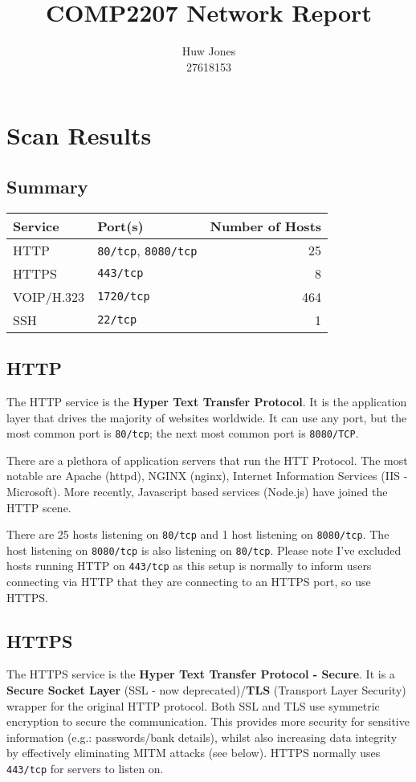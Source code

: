 \documentclass[a4paper]{article}
\author{Huw Jones \\27618153}
\title{COMP2207 Network Report}
\begin{document}
\maketitle
\newpage

\section{Scan Results}
\subsection{Summary}
\begin{tabular}{|l|l|r|}\hline
Service & Port(s) & Number of Hosts \\ \hline
HTTP & \texttt{80/tcp}, \texttt{8080/tcp} & 25 \\ \hline
HTTPS & \texttt{443/tcp} & 8 \\ \hline
VOIP/H.323 & \texttt{1720/tcp} & 464 \\ \hline
SSH & \texttt{22/tcp} & 1 \\ \hline
\end{tabular}

\subsection{HTTP}
The HTTP service is the \textbf{Hyper Text Transfer Protocol}.
It is the application layer that drives the majority of websites worldwide.
It can use any port, but the most common port is \texttt{80/tcp}; the next most common port is \texttt{8080/TCP}.

There are a plethora of application servers that run the HTT Protocol.
The most notable are Apache (httpd), NGINX (nginx), Internet Information Services (IIS - Microsoft).
More recently, Javascript based services (Node.js) have joined the HTTP scene.

There are 25 hosts listening on \texttt{80/tcp} and 1 host listening on \texttt{8080/tcp}.
The host listening on \texttt{8080/tcp} is also listening on \texttt{80/tcp}.
Please note I've excluded hosts running HTTP on \texttt{443/tcp} as this setup is normally to inform users connecting via HTTP that they are connecting to an HTTPS port, so use HTTPS.

\subsection{HTTPS}
The HTTPS service is the \textbf{Hyper Text Transfer Protocol - Secure}.
It is a \textbf{Secure Socket Layer} (SSL - now deprecated)/\textbf{TLS} (Transport Layer Security) wrapper for the original HTTP protocol.
Both SSL and TLS use symmetric encryption to secure the communication.
This provides more security for sensitive information (e.g.: passwords/bank details), whilst also increasing data integrity by effectively eliminating MITM attacks (see below).
HTTPS normally uses \texttt{443/tcp} for servers to listen on.
\end{document}
